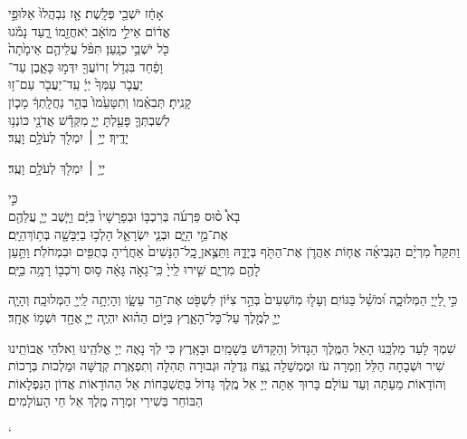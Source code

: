 אָחַ֔ז יֹשְׁבֵ֖י פְּלָֽשֶׁת׃ \hfill אָ֤ז נִבְהֲלוּ֙ אַלּוּפֵ֣י \\
אֱד֔וֹם \hfill אֵילֵ֣י מוֹאָ֔ב יֹֽאחֲזֵ֖מוֹ רָ֑עַד \hfill נָמֹ֕גוּ \\
כֹּ֖ל יֹשְׁבֵ֥י כְנָֽעַן׃ \hfill תִּפֹּ֨ל עֲלֵיהֶ֤ם אֵימָ֙תָה֙ \\
וָפַ֔חַד \hfill בִּגְדֹ֥ל זְרוֹעֲךָ֖ יִדְּמ֣וּ כָּאָ֑בֶן \hfill עַד־\\
יַעֲבֹ֤ר עַמְּךָ֙ יְיָ֔ \hfill עַֽד־יַעֲבֹ֖ר עַם־ז֥וּ \\
קָנִֽיתָ׃ \hfill תְּבִאֵ֗מוֹ וְתִטָּעֵ֙מוֹ֙ בְּהַ֣ר נַחֲלָֽתְךָ֔ \hfill מָכ֧וֹן \\
לְשִׁבְתְּךָ֛ פָּעַ֖לְתָּ יְיָ֑ \hfill מִקְּדָ֕שׁ אֲדֹנָ֖י כּוֹנְנ֥וּ \\
יָדֶֽיךָ׃ \hfill יְיָ֥ ׀ יִמְלֹ֖ךְ לְעֹלָ֥ם וָעֶֽד׃ \begin{footnotesize}יְיָ֥ ׀ יִמְלֹ֖ךְ לְעֹלָ֥ם וָעֶֽד׃\end{footnotesize}
\hfill \begin{small} כִּ֣י \\
	בָא֩ ס֨וּס פַּרְעֹ֜ה בְּרִכְבּ֤וֹ וּבְפָרָשָׁיו֙ בַּיָּ֔ם \hfill וַיָּ֧שֶׁב יְיָ֛ עֲלֵהֶ֖ם \\
	אֶת־מֵ֣י הַיָּ֑ם \hfill וּבְנֵ֧י יִשְׂרָאֵ֛ל הָלְכ֥וּ בַיַּבָּשָׁ֖ה בְּת֥וֹךְ\hfill הַיָּֽם׃\\
	וַתִּקַּח֩ מִרְיָ֨ם הַנְּבִיאָ֜ה אֲח֧וֹת אַהֲרֹ֛ן אֶת־הַתֹּ֖ף בְּיָדָ֑הּ וַתֵּצֶ֤אןָ כׇֽל־הַנָּשִׁים֙ אַחֲרֶ֔יהָ בְּתֻפִּ֖ים וּבִמְחֹלֹֽת׃ וַתַּ֥עַן לָהֶ֖ם מִרְיָ֑ם שִׁ֤ירוּ לַֽייָ֙ כִּֽי־גָאֹ֣ה גָּאָ֔ה ס֥וּס וְרֹכְב֖וֹ רָמָ֥ה בַיָּֽם׃\hfill\break 
\end{small}


כִּ֣י לַ֭ייָ֭ הַמְּלוּכָ֑ה וּ֝מֹשֵׁ֗ל בַּגּוֹיִֽם׃
וְעָל֤וּ מֽוֹשִׁעִים֙ בְּהַ֣ר צִיּ֔וֹן לִשְׁפֹּ֖ט אֶת־הַ֣ר עֵשָׂ֑ו וְהָיְתָ֥ה לַֽייָ֖ הַמְּלוּכָֽה׃
וְהָיָ֧ה יְיָ֛ לְמֶ֖לֶךְ עַל־כׇּל־הָאָ֑רֶץ בַּיּ֣וֹם הַה֗וּא יִהְיֶ֧ה יְיָ֛ אֶחָ֖ד וּשְׁמ֥וֹ אֶחָֽד׃

\nextpage
{}
שִׁמְךָ לָעַד מַלְכֵּֽנוּ הָאֵל הַמֶּֽלֶךְ הַגָּדוֹל וְהַקָּדוֹשׁ בַּשָׁמַֽיִם וּבָאָֽרֶץ כִּי לְךָ נָאֶה יְיָ אֱלֹהֵֽינוּ וֵאלֹהֵי אֲבוֹתֵֽינוּ שִׁיר וּשְׁבָחָה הַלֵּל וְזִמְרָה עֹז וּמֶמְשָׁלָה נֶֽצַח גְּדֻלָּה וּגְבוּרָה תְּהִלָּה וְתִפְאֶֽרֶת קְדֻשָּׁה וּמַלְכוּת בְּרָכוֹת וְהוֹדָאוֹת מֵעַתָּה וְעַד עוֹלָם׃ בָּרוּךְ אַתָּה יְיָ אֵל מֶֽלֶךְ גָּדוֹל בַּתֻּשְׁבָּחוֹת אֵל הַהוֹדָאוֹת אֲדוֹן הַנִּפְלָאוֹת הַבּוֹחֵר בְּשִׁירֵי זִמְרָה מֶֽלֶךְ אֵל חֵי הָעוֹלָמִים׃

\mimaamakim

\halfkaddish

\enlargethispage{\baselineskip}

`\vspace{1.25\baselineskip}